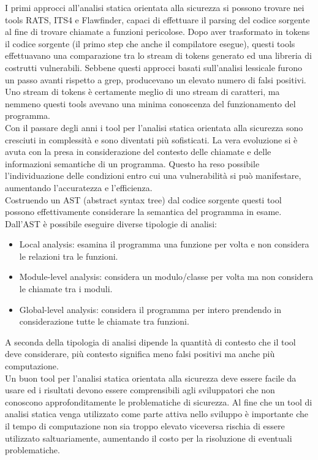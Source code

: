 I primi approcci all'analisi statica orientata alla sicurezza si possono trovare nei tools RATS, ITS4 e Flawfinder, capaci di effettuare il parsing del codice sorgente al fine di trovare chiamate a funzioni pericolose. Dopo aver trasformato in tokens il codice sorgente (il primo step che anche il compilatore esegue), questi tools effettuavano una comparazione tra lo stream di tokens generato ed una libreria di costrutti vulnerabili. Sebbene questi approcci basati sull'analisi lessicale furono un passo avanti rispetto a grep, producevano un elevato numero di falsi positivi. Uno stream di tokens è certamente meglio di uno stream di caratteri, ma nemmeno questi tools avevano una minima conoscenza del funzionamento del programma. \\
Con il passare degli anni i tool per l'analisi statica orientata alla sicurezza sono cresciuti in complessità e sono diventati più sofisticati. La vera evoluzione si è avuta con la presa in considerazione del contesto delle chiamate e delle informazioni semantiche di un programma. Questo ha reso possibile l'individuazione delle condizioni entro cui una vulnerabilità si può manifestare, aumentando l'accuratezza e l'efficienza.\\
Costruendo un AST (abstract syntax tree) dal codice sorgente questi tool possono effettivamente considerare la semantica del programma in esame. Dall'AST è possibile eseguire diverse tipologie di analisi:
\begin{itemize}
\item Local analysis: esamina il programma una funzione per volta e non considera le relazioni tra le funzioni.
\item Module-level analysis: considera un modulo/classe per volta ma non considera le chiamate tra i moduli.
\item Global-level analysis: considera il programma per intero prendendo in considerazione tutte le chiamate tra funzioni.
\end{itemize}
A seconda della tipologia di analisi dipende la quantità di contesto che il tool deve considerare, più contesto significa meno falsi positivi ma anche più computazione.\\
Un buon tool per l'analisi statica orientata alla sicurezza deve essere facile da usare ed i risultati devono essere comprensibili agli sviluppatori che non conoscono approfonditamente le problematiche di sicurezza. Al fine che un tool di analisi statica venga utilizzato come parte attiva nello sviluppo è importante che il tempo di computazione non sia troppo elevato viceversa rischia di essere utilizzato saltuariamente, aumentando il costo per la risoluzione di eventuali problematiche.

